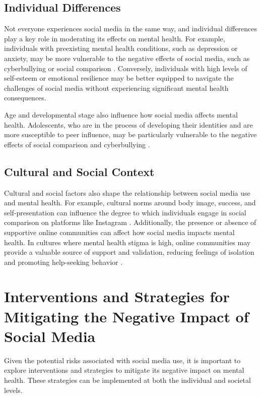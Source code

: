 \documentclass[12pt]{article}
\begin{document}
\subsection{Individual Differences}

Not everyone experiences social media in the same way, and individual differences play a key role in moderating its effects on mental health. For example, individuals with preexisting mental health conditions, such as depression or anxiety, may be more vulnerable to the negative effects of social media, such as cyberbullying or social comparison \cite{hampton2014}. Conversely, individuals with high levels of self-esteem or emotional resilience may be better equipped to navigate the challenges of social media without experiencing significant mental health consequences.

Age and developmental stage also influence how social media affects mental health. Adolescents, who are in the process of developing their identities and are more susceptible to peer influence, may be particularly vulnerable to the negative effects of social comparison and cyberbullying \cite{lenhart2015}.

\subsection{Cultural and Social Context}

Cultural and social factors also shape the relationship between social media use and mental health. For example, cultural norms around body image, success, and self-presentation can influence the degree to which individuals engage in social comparison on platforms like Instagram \cite{valkenburg2006}. Additionally, the presence or absence of supportive online communities can affect how social media impacts mental health. In cultures where mental health stigma is high, online communities may provide a valuable source of support and validation, reducing feelings of isolation and promoting help-seeking behavior \cite{valkenburg2006}.

\section{Interventions and Strategies for Mitigating the Negative Impact of Social Media}

Given the potential risks associated with social media use, it is important to explore interventions and strategies to mitigate its negative impact on mental health. These strategies can be implemented at both the individual and societal levels.
\end{document}
